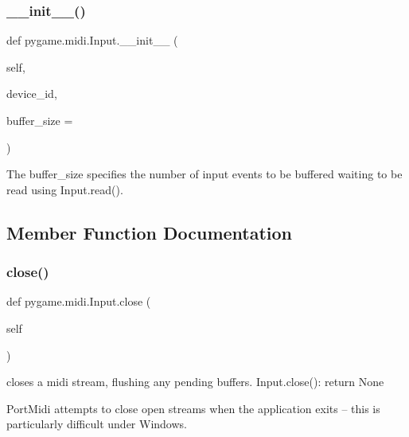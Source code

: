 \subsubsection{\texorpdfstring{\+\_\+\+\_\+init\+\_\+\+\_\+()}{\_\_init\_\_()}}
{\footnotesize\ttfamily def pygame.\+midi.\+Input.\+\_\+\+\_\+init\+\_\+\+\_\+ (\begin{DoxyParamCaption}\item[{}]{self,  }\item[{}]{device\+\_\+id,  }\item[{}]{buffer\+\_\+size = {} }\end{DoxyParamCaption})}

\begin{DoxyVerb}The buffer_size specifies the number of input events to be buffered
waiting to be read using Input.read().
\end{DoxyVerb}
 

\subsection{Member Function Documentation}
\mbox{\label{classpygame_1_1midi_1_1_input_a304ec0bb72449b749418786ea97e0256}} 
\subsubsection{\texorpdfstring{close()}{close()}}
{\footnotesize\ttfamily def pygame.\+midi.\+Input.\+close (\begin{DoxyParamCaption}\item[{}]{self }\end{DoxyParamCaption})}

\begin{DoxyVerb}closes a midi stream, flushing any pending buffers.
Input.close(): return None

PortMidi attempts to close open streams when the application
exits -- this is particularly difficult under Windows.
\end{DoxyVerb}
 \mbox{\label{classpygame_1_1midi_1_1_input_a4f4c04b798c914b0b469a78e79350908}} 

